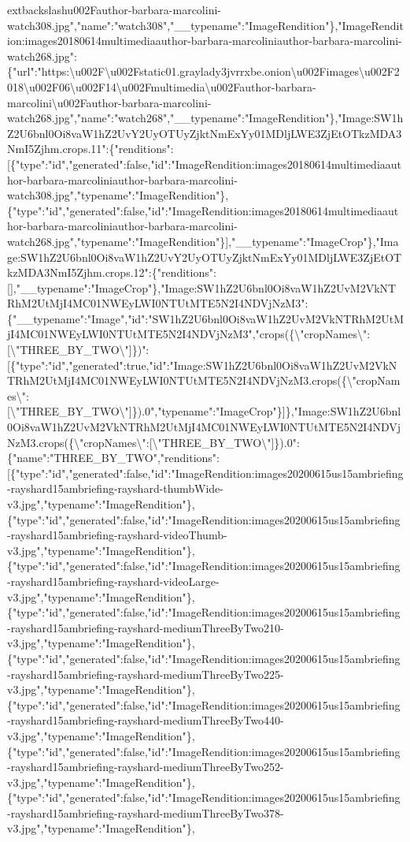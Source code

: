 extbackslash{}u002Fauthor-barbara-marcolini-watch308.jpg","name":"watch308","\_\_typename":"ImageRendition"\},"ImageRendition:images20180614multimediaauthor-barbara-marcoliniauthor-barbara-marcolini-watch268.jpg":\{"url":"https:\textbackslash{}u002F\textbackslash{}u002Fstatic01.graylady3jvrrxbe.onion\textbackslash{}u002Fimages\textbackslash{}u002F2018\textbackslash{}u002F06\textbackslash{}u002F14\textbackslash{}u002Fmultimedia\textbackslash{}u002Fauthor-barbara-marcolini\textbackslash{}u002Fauthor-barbara-marcolini-watch268.jpg","name":"watch268","\_\_typename":"ImageRendition"\},"Image:SW1hZ2U6bnl0Oi8vaW1hZ2UvY2UyOTUyZjktNmExYy01MDljLWE3ZjEtOTkzMDA3NmI5Zjhm.crops.11":\{"renditions":{[}\{"type":"id","generated":false,"id":"ImageRendition:images20180614multimediaauthor-barbara-marcoliniauthor-barbara-marcolini-watch308.jpg","typename":"ImageRendition"\},\{"type":"id","generated":false,"id":"ImageRendition:images20180614multimediaauthor-barbara-marcoliniauthor-barbara-marcolini-watch268.jpg","typename":"ImageRendition"\}{]},"\_\_typename":"ImageCrop"\},"Image:SW1hZ2U6bnl0Oi8vaW1hZ2UvY2UyOTUyZjktNmExYy01MDljLWE3ZjEtOTkzMDA3NmI5Zjhm.crops.12":\{"renditions":{[}{]},"\_\_typename":"ImageCrop"\},"Image:SW1hZ2U6bnl0Oi8vaW1hZ2UvM2VkNTRhM2UtMjI4MC01NWEyLWI0NTUtMTE5N2I4NDVjNzM3":\{"\_\_typename":"Image","id":"SW1hZ2U6bnl0Oi8vaW1hZ2UvM2VkNTRhM2UtMjI4MC01NWEyLWI0NTUtMTE5N2I4NDVjNzM3","crops(\{\textbackslash{}"cropNames\textbackslash{}":{[}\textbackslash{}"THREE\_BY\_TWO\textbackslash{}"{]}\})":{[}\{"type":"id","generated":true,"id":"Image:SW1hZ2U6bnl0Oi8vaW1hZ2UvM2VkNTRhM2UtMjI4MC01NWEyLWI0NTUtMTE5N2I4NDVjNzM3.crops(\{\textbackslash{}"cropNames\textbackslash{}":{[}\textbackslash{}"THREE\_BY\_TWO\textbackslash{}"{]}\}).0","typename":"ImageCrop"\}{]}\},"Image:SW1hZ2U6bnl0Oi8vaW1hZ2UvM2VkNTRhM2UtMjI4MC01NWEyLWI0NTUtMTE5N2I4NDVjNzM3.crops(\{\textbackslash{}"cropNames\textbackslash{}":{[}\textbackslash{}"THREE\_BY\_TWO\textbackslash{}"{]}\}).0":\{"name":"THREE\_BY\_TWO","renditions":{[}\{"type":"id","generated":false,"id":"ImageRendition:images20200615us15ambriefing-rayshard15ambriefing-rayshard-thumbWide-v3.jpg","typename":"ImageRendition"\},\{"type":"id","generated":false,"id":"ImageRendition:images20200615us15ambriefing-rayshard15ambriefing-rayshard-videoThumb-v3.jpg","typename":"ImageRendition"\},\{"type":"id","generated":false,"id":"ImageRendition:images20200615us15ambriefing-rayshard15ambriefing-rayshard-videoLarge-v3.jpg","typename":"ImageRendition"\},\{"type":"id","generated":false,"id":"ImageRendition:images20200615us15ambriefing-rayshard15ambriefing-rayshard-mediumThreeByTwo210-v3.jpg","typename":"ImageRendition"\},\{"type":"id","generated":false,"id":"ImageRendition:images20200615us15ambriefing-rayshard15ambriefing-rayshard-mediumThreeByTwo225-v3.jpg","typename":"ImageRendition"\},\{"type":"id","generated":false,"id":"ImageRendition:images20200615us15ambriefing-rayshard15ambriefing-rayshard-mediumThreeByTwo440-v3.jpg","typename":"ImageRendition"\},\{"type":"id","generated":false,"id":"ImageRendition:images20200615us15ambriefing-rayshard15ambriefing-rayshard-mediumThreeByTwo252-v3.jpg","typename":"ImageRendition"\},\{"type":"id","generated":false,"id":"ImageRendition:images20200615us15ambriefing-rayshard15ambriefing-rayshard-mediumThreeByTwo378-v3.jpg","typename":"ImageRendition"\},\